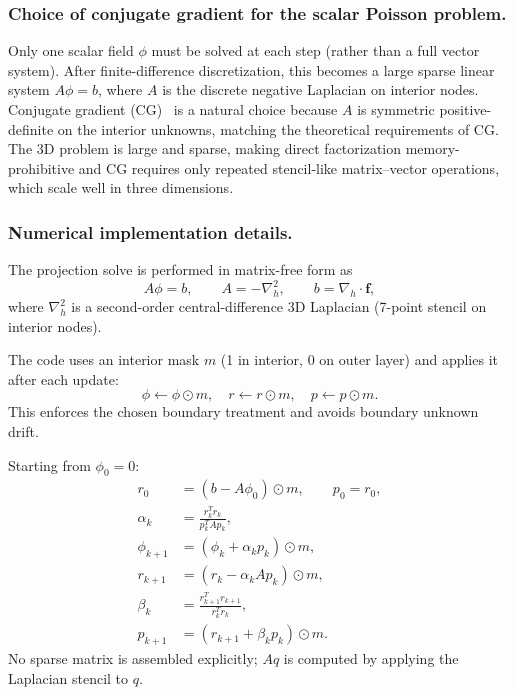 \documentclass{iopjournal}
\begin{document}
\subsubsection{Choice of conjugate gradient for the scalar Poisson problem.}
Only one scalar field $\phi$ must be solved at each step (rather than a full
vector system). After finite-difference discretization, this becomes a large
sparse linear system $A\phi=b$, where $A$ is the discrete negative Laplacian
on interior nodes. Conjugate gradient (CG)~\cite{shewchuk1994conjugate,golub2013matrix} is a
natural choice because $A$ is symmetric positive-definite on the interior
unknowns, matching the theoretical requirements of CG. The 3D problem is large
and sparse, making direct factorization memory-prohibitive and CG requires only
repeated stencil-like matrix--vector operations, which scale well in three
dimensions.

\subsubsection{Numerical implementation details.}
The projection solve is performed in matrix-free form as
\begin{equation}
A\phi=b, \qquad A=-\nabla_h^2, \qquad b=\nabla_h\cdot\bm{f},
\end{equation}
where $\nabla_h^2$ is a second-order central-difference 3D Laplacian (7-point
stencil on interior nodes).


The code uses an interior mask $m$ (1 in interior, 0 on outer layer) and
applies it after each update:
\begin{equation}
\phi \leftarrow \phi \odot m,\quad r \leftarrow r \odot m,\quad p \leftarrow p \odot m.
\end{equation}
This enforces the chosen boundary treatment and avoids boundary unknown drift.

Starting from $\phi_0=0$:
\begin{align}
r_0 &= (b-A\phi_0)\odot m, \qquad p_0=r_0,\\
\alpha_k &= \frac{r_k^T r_k}{p_k^T A p_k},\\
\phi_{k+1} &= (\phi_k + \alpha_k p_k)\odot m,\\
r_{k+1} &= (r_k - \alpha_k A p_k)\odot m,\\
\beta_k &= \frac{r_{k+1}^T r_{k+1}}{r_k^T r_k},\\
p_{k+1} &= (r_{k+1} + \beta_k p_k)\odot m.
\end{align}
No sparse matrix is assembled explicitly; $Aq$ is computed by applying the
Laplacian stencil to $q$.
\end{document}
